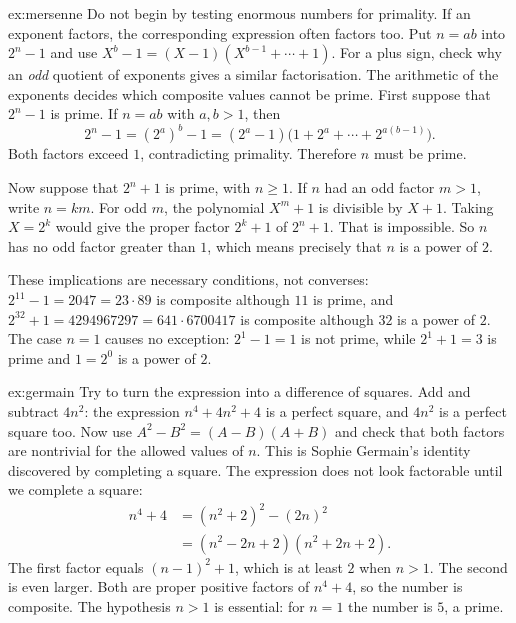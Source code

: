 \begin{solution}{ex:mersenne}
\idea Do not begin by testing enormous numbers for primality. If an exponent factors, the corresponding expression often factors too. Put $n=ab$ into $2^n-1$ and use $X^b-1=(X-1)(X^{b-1}+\cdots+1)$. For a plus sign, check why an \emph{odd} quotient of exponents gives a similar factorisation. The arithmetic of the exponents decides which composite values cannot be prime.
\writeup First suppose that $2^n-1$ is prime. If $n=ab$ with $a,b>1$, then
\[
2^n-1=(2^a)^b-1
=(2^a-1)\bigl(1+2^a+\cdots+2^{a(b-1)}\bigr).
\]
Both factors exceed $1$, contradicting primality. Therefore $n$ must be prime.

Now suppose that $2^n+1$ is prime, with $n\ge1$. If $n$ had an odd factor $m>1$, write $n=km$. For odd $m$, the polynomial $X^m+1$ is divisible by $X+1$. Taking $X=2^k$ would give the proper factor $2^k+1$ of $2^n+1$. That is impossible. So $n$ has no odd factor greater than $1$, which means precisely that $n$ is a power of $2$.

These implications are necessary conditions, not converses: $2^{11}-1=2047=23\cdot89$ is composite although $11$ is prime, and $2^{32}+1=4294967297=641\cdot6700417$ is composite although $32$ is a power of $2$. The case $n=1$ causes no exception: $2^1-1=1$ is not prime, while $2^1+1=3$ is prime and $1=2^0$ is a power of $2$.
\end{solution}

\begin{solution}{ex:germain}
\idea Try to turn the expression into a difference of squares. Add and subtract $4n^2$: the expression $n^4+4n^2+4$ is a perfect square, and $4n^2$ is a perfect square too. Now use $A^2-B^2=(A-B)(A+B)$ and check that both factors are nontrivial for the allowed values of $n$. This is Sophie Germain's identity discovered by completing a square.
\writeup The expression does not look factorable until we complete a square:
\[
\begin{aligned}
n^4+4
&=(n^2+2)^2-(2n)^2\\
&=(n^2-2n+2)(n^2+2n+2).
\end{aligned}
\]
The first factor equals $(n-1)^2+1$, which is at least $2$ when $n>1$. The second is even larger. Both are proper positive factors of $n^4+4$, so the number is composite. The hypothesis $n>1$ is essential: for $n=1$ the number is $5$, a prime.
\end{solution}

